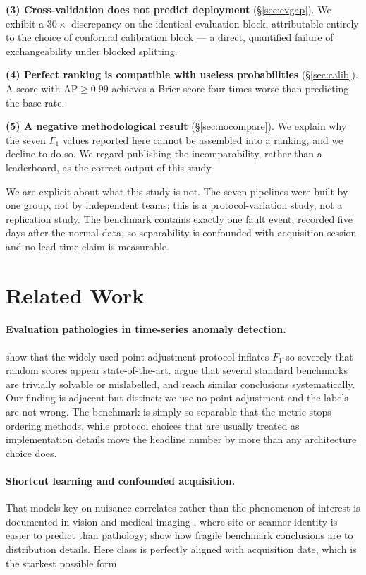 \documentclass{article}
\begin{document}
\textbf{(3) Cross-validation does not predict deployment}
(\S\ref{sec:cvgap}). We exhibit a $30\times$ discrepancy on the identical
evaluation block, attributable entirely to the choice of conformal calibration
block --- a direct, quantified failure of exchangeability under blocked
splitting.

\textbf{(4) Perfect ranking is compatible with useless probabilities}
(\S\ref{sec:calib}). A score with $\mathrm{AP} \ge 0.99$ achieves a Brier
score four times worse than predicting the base rate.

\textbf{(5) A negative methodological result} (\S\ref{sec:nocompare}). We
explain why the seven $F_1$ values reported here cannot be assembled into a
ranking, and we decline to do so. We regard publishing the incomparability,
rather than a leaderboard, as the correct output of this study.

We are explicit about what this study is not. The seven pipelines were built by
one group, not by independent teams; this is a protocol-variation study, not a
replication study. The benchmark contains exactly one fault event, recorded
five days after the normal data, so separability is confounded with acquisition
session and no lead-time claim is measurable.

\section{Related Work}
\label{sec:related}

\paragraph{Evaluation pathologies in time-series anomaly detection.}
\citet{kim2022towards} show that the widely used point-adjustment protocol
inflates $F_1$ so severely that random scores appear state-of-the-art.
\citet{wu2023current} argue that several standard benchmarks are trivially
solvable or mislabelled, and \citet{garg2022evaluation} reach similar
conclusions systematically. Our finding is adjacent but distinct: we use no
point adjustment and the labels are not wrong. The benchmark is simply so
separable that the metric stops ordering methods, while protocol choices that
are usually treated as implementation details move the headline number by more
than any architecture choice does.

\paragraph{Shortcut learning and confounded acquisition.}
That models key on nuisance correlates rather than the phenomenon of interest
is documented in vision and medical imaging
\citep{geirhos2020shortcut,zech2018variable}, where site or scanner identity is
easier to predict than pathology; \citet{recht2019imagenet} show how fragile
benchmark conclusions are to distribution details. Here class is perfectly
aligned with acquisition date, which is the starkest possible form.
\end{document}
